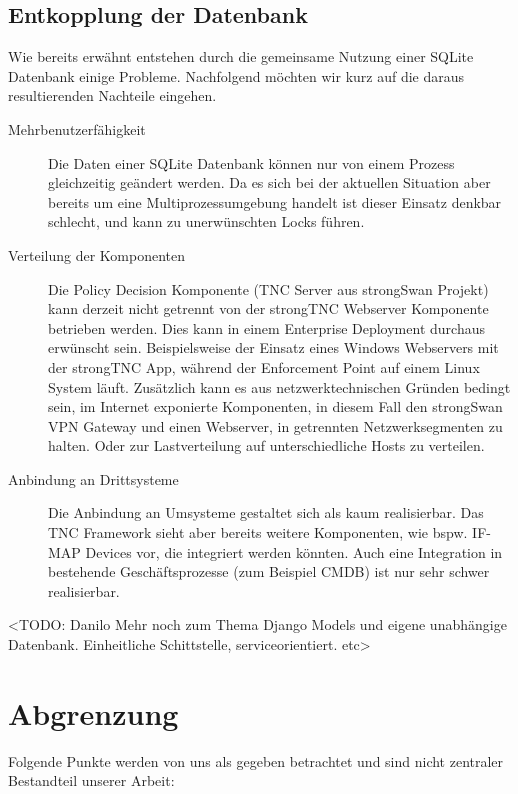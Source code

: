 \subsection{Entkopplung der Datenbank}
Wie bereits erwähnt entstehen durch die gemeinsame Nutzung einer SQLite
Datenbank einige Probleme. Nachfolgend möchten wir kurz auf die daraus
resultierenden Nachteile eingehen.

\begin{description}
	\item[Mehrbenutzerfähigkeit] Die Daten einer SQLite Datenbank können nur von
	einem Prozess gleichzeitig geändert werden. Da es sich bei der aktuellen
	Situation aber bereits um eine Multiprozessumgebung handelt ist dieser Einsatz
	denkbar schlecht, und kann zu unerwünschten Locks führen.

	\item[Verteilung der Komponenten] Die Policy Decision Komponente (TNC Server
	aus strongSwan Projekt) kann derzeit nicht getrennt von der strongTNC Webserver
	Komponente betrieben werden. Dies kann in einem Enterprise Deployment
	durchaus erwünscht sein. Beispielsweise der Einsatz eines Windows Webservers
	mit der strongTNC App, während der Enforcement Point auf einem Linux System
	läuft. Zusätzlich kann es aus netzwerktechnischen Gründen bedingt sein, im
	Internet exponierte Komponenten, in diesem Fall den strongSwan VPN Gateway und
	einen Webserver, in getrennten Netzwerksegmenten zu halten. Oder zur
	Lastverteilung auf unterschiedliche Hosts zu verteilen.

	\item[Anbindung an Drittsysteme] Die Anbindung an Umsysteme gestaltet sich als
	kaum realisierbar. Das TNC Framework sieht aber bereits weitere Komponenten,
	wie bspw. IF-MAP Devices vor, die integriert werden könnten. Auch eine
	Integration in bestehende Geschäftsprozesse (zum Beispiel CMDB) ist nur sehr
	schwer realisierbar.
\end{description} 

<TODO: Danilo Mehr noch zum Thema Django Models und eigene unabhängige Datenbank.
Einheitliche Schittstelle, serviceorientiert. etc>

\section{Abgrenzung}
Folgende Punkte werden von uns als gegeben betrachtet und sind nicht zentraler
Bestandteil unserer Arbeit:

